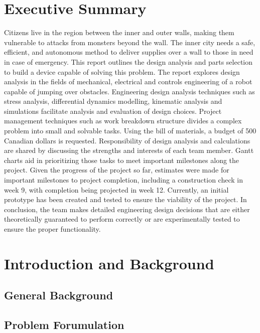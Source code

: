 \documentclass[ece]{uw-wkrpt}
\let\oldsection\section
\renewcommand\section{\clearpage\oldsection}
\begin{document}
\section{Executive Summary}\label{sec:summary}
Citizens live in the region between the inner and outer walls, making them vulnerable to attacks from monsters beyond the wall. The inner city needs a safe, efficient, and autonomous method to deliver supplies over a wall to those in need in case of emergency. This report outlines the design analysis and parts selection to build a device capable of solving this problem. The report explores design analysis in the fields of mechanical, electrical and controls engineering of a robot capable of jumping over obstacles. Engineering design analysis techniques such as stress analysis, differential dynamics modelling, kinematic analysis and simulations facilitate analysis and evaluation of design choices. Project management techniques such as work breakdown structure divides a complex problem into small and solvable tasks. Using the bill of materials, a budget of 500 Canadian dollars is requested. Responsibility of design analysis and calculations are shared by discussing the strengths and interests of each team member. Gantt charts aid in prioritizing those tasks to meet important milestones along the project. Given the progress of the project so far, estimates were made for important milestones to project completion, including a construction check in week 9, with completion being projected in week 12. Currently, an initial prototype has been created and tested to ensure the viability of the project. In conclusion, the team makes detailed engineering design decisions that are either theoretically guaranteed to perform correctly or are experimentally tested to ensure the proper functionality.

\tableofcontents
\listoffigures
\listoftables



\mainmatter

% 
\section{Introduction and Background}
\subsection{General Background}
\subsection{Problem Forumulation}
\end{document}
